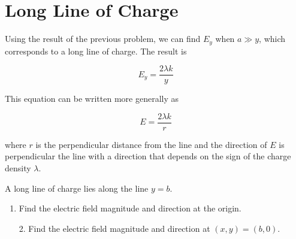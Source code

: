 \documentclass{article}
\begin{document}
\vskip 36.135pt

\section{Long Line of Charge}

Using the result of the previous problem, we can find $E_y$ when $a \gg y$, which corresponds to a long line of charge. The result is

\begin{equation}
  E_y=\frac{2\lambda k}{y}
\end{equation}

This equation can be written more generally as

\begin{equation}
  E=\frac{2\lambda k}{r}
\end{equation}

where $r$ is the perpendicular distance from the line and the direction of $E$ is perpendicular the line with a direction that depends on the sign of the charge density $\lambda$.

A long line of charge lies along the line $y=b$.

\begin{enumerate}

  \item Find the electric field magnitude and direction at the origin.

\end{enumerate}

\vskip 72.27pt

\begin{enumerate}

  \item[2.] Find the electric field magnitude and direction at $(x,y)=(b,0)$.

\end{enumerate}
\end{document}
